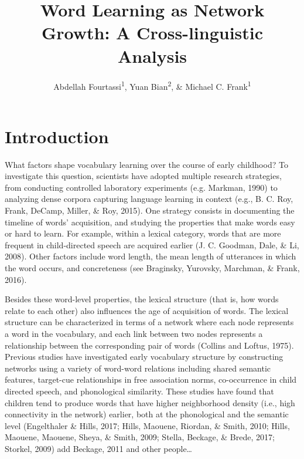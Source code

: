 \documentclass[english,floatsintext,man]{apa6}
\title{Word Learning as Network Growth: A Cross-linguistic Analysis}
\author{Abdellah Fourtassi\textsuperscript{1}, Yuan Bian\textsuperscript{2}, \& Michael C. Frank\textsuperscript{1}}
\affiliation{
    \vspace{0.5cm}
          \textsuperscript{1} Department of Psychology, Stanford University\\
          \textsuperscript{2} Department of Psychology, University of Illinois  }
\theoremstyle{definition}
\theoremstyle{definition}
\theoremstyle{definition}
\theoremstyle{remark}
\begin{document}
\maketitle

\setcounter{secnumdepth}{0}



\section{Introduction}\label{introduction}

What factors shape vocabulary learning over the course of early
childhood? To investigate this question, scientists have adopted
multiple research strategies, from conducting controlled laboratory
experiments (e.g. Markman, 1990) to analyzing dense corpora capturing
language learning in context (e.g., B. C. Roy, Frank, DeCamp, Miller, \&
Roy, 2015). One strategy consists in documenting the timeline of words'
acquisition, and studying the properties that make words easy or hard to
learn. For example, within a lexical category, words that are more
frequent in child-directed speech are acquired earlier (J. C. Goodman,
Dale, \& Li, 2008). Other factors include word length, the mean length
of utterances in which the word occurs, and concreteness (see Braginsky,
Yurovsky, Marchman, \& Frank, 2016).

Besides these word-level properties, the lexical structure (that is, how
words relate to each other) also influences the age of acquisition of
words. The lexical structure can be characterized in terms of a network
where each node represents a word in the vocabulary, and each link
between two nodes represents a relationship between the corresponding
pair of words (Collins and Loftus, 1975). Previous studies have
investigated early vocabulary structure by constructing networks using a
variety of word-word relations including shared semantic features,
target-cue relationships in free association norms, co-occurrence in
child directed speech, and phonological similarity. These studies have
found that children tend to produce words that have higher neighborhood
density (i.e., high connectivity in the network) earlier, both at the
phonological and the semantic level (Engelthaler \& Hills, 2017; Hills,
Maouene, Riordan, \& Smith, 2010; Hills, Maouene, Maouene, Sheya, \&
Smith, 2009; Stella, Beckage, \& Brede, 2017; Storkel, 2009) add
Beckage, 2011 and other people\ldots{}
\end{document}
